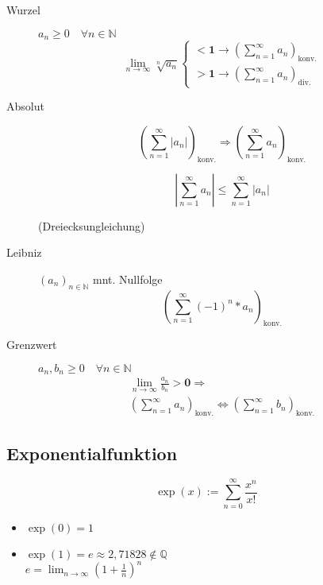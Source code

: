\begin{description}
      \item [Wurzel]
            $a_n \geq 0 \quad \forall n \in \mathbb{N}$
            $$
                  \lim_{n \rightarrow \infty} \sqrt[n]{a_n} \begin{cases}
                        \mathbf{< 1} \rightarrow (\sum_{n = 1}^\infty a_n)_\text{konv.} \\
                        \mathbf{> 1} \rightarrow (\sum_{n = 1}^\infty a_n)_\text{div.}
                  \end{cases}
            $$

      \item [Absolut]
            $$(\sum_{n=1}^\infty | a_n |)_\text{konv.} \Rightarrow (\sum_{n=1}^\infty a_n)_\text{konv.}$$

            $$| \sum_{n=1}^\infty a_n | \leq \sum_{n=1}^\infty | a_n |$$

            (Dreiecksungleichung)

      \item [Leibniz] $(a_n)_{n \in \mathbb{N}}$ mnt. Nullfolge
            $$(\sum_{n=1}^\infty (-1)^n * a_n)_\text{konv.}$$

      \item [Grenzwert] $a_n, b_n \geq 0 \quad \forall n \in \mathbb{N}$
            \begin{gather*}
                  \lim_{n \rightarrow \infty} \frac{a_n}{b_n} \mathbf{> 0} \Rightarrow \\
                  (\sum_{n=1}^\infty a_n)_\text{konv.} \Leftrightarrow (\sum_{n=1}^\infty b_n)_\text{konv.}
            \end{gather*}
\end{description}

\subsection{Exponentialfunktion}

$$\exp(x) := \sum_{n = 0}^\infty \frac{x^n}{x!}$$

\begin{itemize}
      \item $\exp(0) = 1$
      \item
            $\exp(1) = e \approx 2,71828 \notin \mathbb{Q}$ \\
            $e = \lim_{n \rightarrow \infty} (1 + \frac{1}{n})^n$
\end{itemize}


